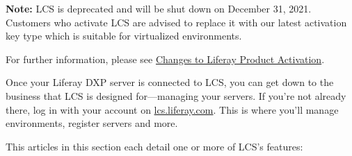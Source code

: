 \noindent\hrulefill

\textbf{Note:} LCS is deprecated and will be shut down on December 31,
2021. Customers who activate LCS are advised to replace it with our
latest activation key type which is suitable for virtualized
environments.

For further information, please see
\href{https://help.liferay.com/hc/en-us/articles/4402347960845-Changes-to-Liferay-Product-Activation}{Changes
to Liferay Product Activation}.

\noindent\hrulefill

Once your Liferay DXP server is connected to LCS, you can get down to
the business that LCS is designed for---managing your servers. If you're
not already there, log in with your account on
\href{https://lcs.liferay.com}{lcs.liferay.com}. This is where you'll
manage environments, register servers and more.

This articles in this section each detail one or more of LCS's features:

